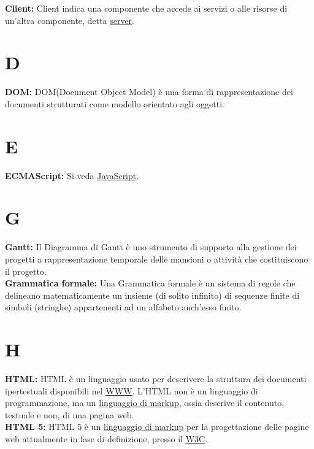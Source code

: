 \hypertarget{client}{}
\textbf{Client:}
Client indica una componente che accede ai servizi o alle risorse di un'altra componente, detta \hyperlink{server}{\underline{server}}.\\

\section*{D}
\hypertarget{dom}{}
\textbf{DOM:}
DOM(Document Object Model) \` e una forma di rappresentazione dei documenti strutturati come modello orientato agli oggetti.\\

\section*{E}
\hypertarget{ecmascript}{}
\textbf{ECMAScript:}
\text Si veda \hyperlink{javascript}{\underline{JavaScript}}.\\

\section*{G}
\hypertarget{gantt}{}
\textbf{Gantt:}
Il Diagramma di Gantt \` e uno strumento di supporto alla gestione dei progetti a rappresentazione temporale delle mansioni o attivit\`a che costituiscono il progetto. \\

\hypertarget{grmfrm}{}
\textbf{Grammatica formale:}
Una Grammatica formale \` e un sistema di regole che delineano matematicamente un insieme (di solito infinito) di sequenze finite di simboli (stringhe) appartenenti ad un alfabeto anch'esso finito.\\

\section*{H}
\hypertarget{html}{}
\textbf{HTML:}
HTML \` e un linguaggio usato per descrivere la struttura dei documenti ipertestuali disponibili nel \hyperlink{www}{\underline{WWW}}.
L'HTML non \` e un linguaggio di programmazione, ma un \hyperlink{linguaggio di markup}{\underline{linguaggio di markup}}, ossia descrive il contenuto, testuale e non, di una pagina web.\\

\hypertarget{html5}{}
\textbf{HTML 5:}
HTML 5 \` e un \hyperlink{linguaggio di markup}{\underline{linguaggio di markup}} per la progettazione delle pagine web attualmente in fase di definizione, presso il \hyperlink{w3c}{\underline{W3C}}.\\ 

